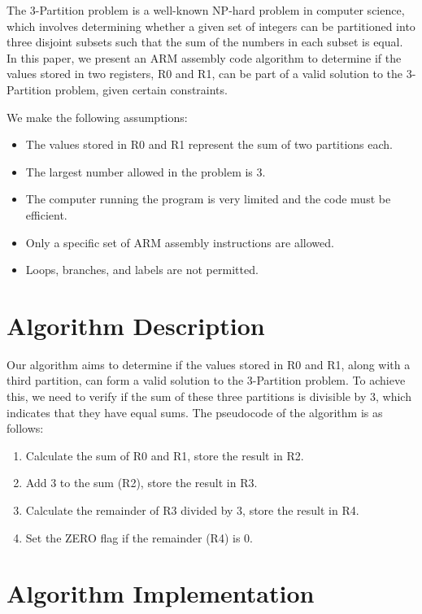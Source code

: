 The 3-Partition problem is a well-known NP-hard problem in computer science, which involves determining whether a given set of integers can be partitioned into three disjoint subsets such that the sum of the numbers in each subset is equal. In this paper, we present an ARM assembly code algorithm to determine if the values stored in two registers, R0 and R1, can be part of a valid solution to the 3-Partition problem, given certain constraints.

We make the following assumptions:
\begin{itemize}
    \item The values stored in R0 and R1 represent the sum of two partitions each.
    \item The largest number allowed in the problem is 3.
    \item The computer running the program is very limited and the code must be efficient.
    \item Only a specific set of ARM assembly instructions are allowed.
    \item Loops, branches, and labels are not permitted.
\end{itemize}

\section{Algorithm Description}

Our algorithm aims to determine if the values stored in R0 and R1, along with a third partition, can form a valid solution to the 3-Partition problem. To achieve this, we need to verify if the sum of these three partitions is divisible by 3, which indicates that they have equal sums. The pseudocode of the algorithm is as follows:

\begin{enumerate}
    \item Calculate the sum of R0 and R1, store the result in R2.
    \item Add 3 to the sum (R2), store the result in R3.
    \item Calculate the remainder of R3 divided by 3, store the result in R4.
    \item Set the ZERO flag if the remainder (R4) is 0.
\end{enumerate}

\section{Algorithm Implementation}

